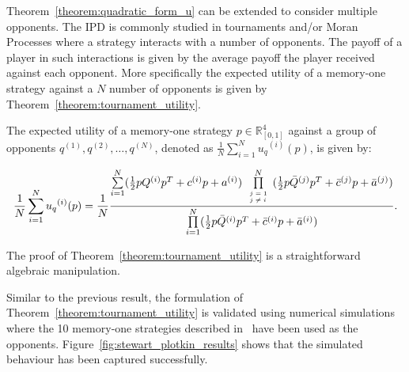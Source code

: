 Theorem~\ref{theorem:quadratic_form_u} can be extended to consider multiple
opponents. The IPD is commonly studied in tournaments and/or Moran Processes
where a strategy interacts with a number of opponents. The payoff of a player in
such interactions is given by the average payoff the player received against
each opponent. More specifically the expected utility of a memory-one strategy
against a \(N\) number of opponents is given by
Theorem~\ref{theorem:tournament_utility}.

\begin{theorem}\label{theorem:tournament_utility}
    The expected utility of a memory-one strategy \(p\in\mathbb{R}_{[0,1]}^4\)
    against a group of opponents \(q^{(1)}, q^{(2)}, \dots, q^{(N)}\), denoted
    as \(\frac{1}{N} \sum\limits_{i=1} ^ {N} {u_q}^{(i)} (p)\), is given by:

    \begin{equation}\label{eq:tournament_utility}
        \frac{1}{N} \sum\limits_{i=1} ^ {N} {u_q}^{(i)} (p) = \frac{1}{N}
        \frac{\sum\limits_{i=1} ^ {N} (\frac{1}{2} pQ^{(i)} p^T + c^{(i)} p + a^ {(i)})
        \prod\limits_{\tiny\begin{array}{l} j=1 \\ j \neq i \end{array}} ^
        N (\frac{1}{2} p\bar{Q}^{(j)} p^T + \bar{c}^{(j)} p + \bar{a}^ {(j)})}
        {\prod\limits_{i=1} ^ N (\frac{1}{2} p\bar{Q}^{(i)} p^T + \bar{c}^{(i)} p + \bar{a}^ {(i)})}.
    \end{equation}
\end{theorem}

The proof of Theorem~\ref{theorem:tournament_utility} is a straightforward algebraic
manipulation.

Similar to the previous result, the formulation of
Theorem~\ref{theorem:tournament_utility} is validated using numerical
simulations where the 10 memory-one strategies described in~\cite{Stewart2012}
have been used as the opponents. Figure~\ref{fig:stewart_plotkin_results} shows
that the simulated behaviour has been captured successfully.

